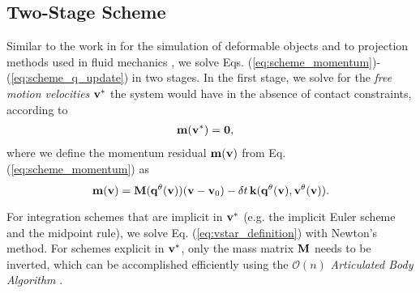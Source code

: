 
\subsection{Two-Stage Scheme}
\label{sec:two_stage_scheme}

Similar to the work in \cite{bib:duriez2005realistic} for the simulation of
deformable objects and to projection methods used in fluid mechanics
\cite{bib::bell1991efficient}, we solve Eqs.
(\ref{eq:scheme_momentum})-(\ref{eq:scheme_q_update}) in two stages. In the
first stage, we solve for the \emph{free motion velocities} ${\mathbf{v}}^*$ the
system would have in the absence of contact constraints, according to
\begin{align}
	\mf{m}(\mf{v}^*) &= \mf{0},
	\label{eq:vstar_definition}
\end{align}
where we define the momentum residual ${\mathbf{m}}({\mathbf{v}})$ from Eq.
(\ref{eq:scheme_momentum}) as
\begin{equation}
	\mf{m}(\mf{v}) =
	\mf{M}(\mf{q}^{\theta}(\mf{v}))(\mf{v}-\mf{v}_0) -
	\delta t\,\mf{k}(\mf{q}^{\theta}(\mf{v}), \mf{v}^{\theta}(\mf{v})).
	\label{eq:m_definition}
\end{equation}

For integration schemes that are implicit in ${\mathbf{v}}^*$ (e.g. the implicit Euler
scheme and the midpoint rule), we solve Eq. (\ref{eq:vstar_definition}) with
Newton's method. For schemes explicit in ${\mathbf{v}}^*$, only the mass matrix
${\mathbf{M}}$ needs to be inverted, which can be accomplished efficiently using the
$\mathcal{O}(n)$ \emph{Articulated Body Algorithm}
\cite{bib:featherstone2008_rigid_body_dynamics_algorithms}.

